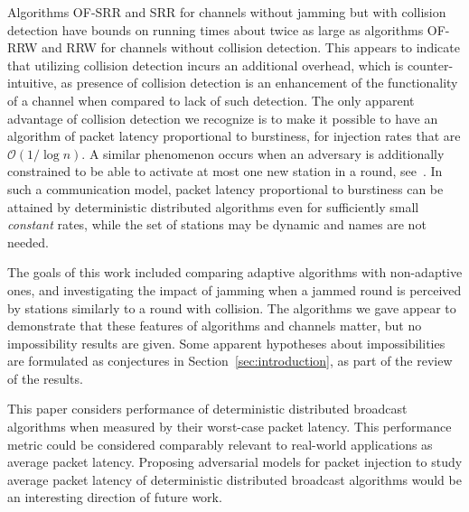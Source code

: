 \documentclass[11pt]{article}
\newcommand{\cO}{\mathcal{O}}
\begin{document}
Algorithms \textsc{OF-SRR} and \textsc{SRR}  for channels without jamming but with collision detection have bounds on running times about twice as large as algorithms \textsc{OF-RRW} and \textsc{RRW} for channels without collision detection.
This appears to indicate that utilizing collision detection incurs an additional overhead, which is counter-intuitive, as presence of collision detection is an enhancement of the functionality of a channel when compared to lack of such detection.
The only apparent advantage of collision detection we recognize is to make it possible to have an algorithm of packet latency proportional to burstiness, for injection rates that are $\cO(1/\log n)$.
A similar phenomenon occurs when an adversary is additionally constrained to be able to activate at most one new station in a round, see~\cite{AnantharamuC15}.
In such a communication model, packet latency proportional to burstiness can be attained by deterministic distributed algorithms even for sufficiently small \emph{constant} rates, while the set of stations may be dynamic and names are not needed.

The goals of this work included comparing adaptive algorithms with non-adaptive ones, and investigating the impact of jamming when a jammed round is perceived by stations similarly to a round with collision.
The algorithms we gave appear to demonstrate that these features of algorithms and channels matter, but no impossibility results are given.
Some apparent hypotheses about impossibilities are formulated as conjectures in Section~\ref{sec:introduction}, as part of the review of the results.

This paper considers performance of deterministic distributed broadcast algorithms when measured by their worst-case packet latency.
This performance metric could be considered comparably relevant to real-world applications as  average packet latency. 
Proposing  adversarial models for packet injection to study average packet latency of deterministic distributed broadcast algorithms would be an interesting direction of future work.







\end{document}
